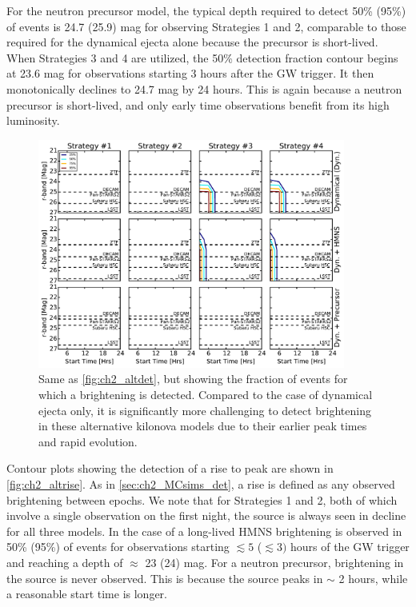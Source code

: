 For the neutron precursor model, the typical depth required to detect 50\% (95\%) of events is 24.7 (25.9) mag for observing Strategies 1 and 2, comparable to those required for the dynamical ejecta alone because the precursor is short-lived. When Strategies 3 and 4 are utilized, the 50\% detection fraction contour begins at 23.6 mag for observations starting 3 hours after the GW trigger. It then monotonically declines to 24.7 mag by 24 hours. This is again because a neutron precursor is short-lived, and only early time observations benefit from its high luminosity.

\begin{figure}[t!]
\centering
\includegraphics[width=0.9\textwidth]{./figs/chapter2/ch2_f20.pdf}
\caption{Same as \autoref{fig:ch2_altdet}, but showing the fraction of events for which a brightening is detected. Compared to the case of dynamical ejecta only, it is significantly more challenging to detect brightening in these alternative kilonova models due to their earlier peak times and rapid evolution.}
\label{fig:ch2_altrise}
\end{figure}

Contour plots showing the detection of a rise to peak are shown in \autoref{fig:ch2_altrise}. As in \autoref{sec:ch2_MCsims_det}, a rise is defined as any observed brightening between epochs. We note that for Strategies 1 and 2, both of which involve a single observation on the first night, the source is always seen in decline for all three models. In the case of a long-lived HMNS brightening is observed in 50\% (95\%) of events for observations starting $\lesssim5$ ($\lesssim 3)$ hours of the GW trigger and reaching a depth of $\approx$ 23 (24) mag. For a neutron precursor, brightening in the source is never observed. This is because the source peaks in $\sim$ 2 hours, while a reasonable start time is longer.

